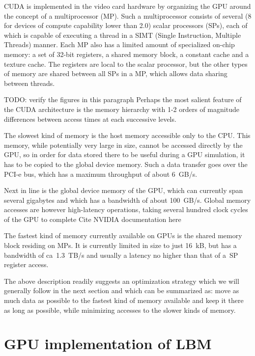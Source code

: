 \documentclass[mathpazo]{cicp}
\begin{document}
CUDA is implemented in the video card hardware by organizing the GPU around the
concept of a multiprocessor (MP).  Such a multiprocessor consists of several (8 for
devices of compute capability lower than 2.0) scalar processors (SPs), each of which is
capable of executing a thread in a SIMT (Single Instruction, Multiple Threads) manner.
Each MP also has a limited amount of specialized on-chip memory: a set of 32-bit registers,
a shared memory block, a constant cache and a texture cache.  The registers are local
to the scalar processor, but the other types of memory are shared between all SPs
in a MP, which allows data sharing between threads.

{\color{red} TODO: verify the figures in this paragraph}
Perhaps the most salient feature of the CUDA architecture is the memory hierarchy
with 1-2 orders of magnitude differences between access times at each successive levels.

The slowest kind of memory is the host memory accessible only to the CPU.  This memory,
while potentially very large in size, cannot be accessed directly by the GPU, so in order
for data stored there to be useful during a GPU simulation, it has to be copied to the
global device memory.  Such a data transfer goes over the PCI-e bus, which has a maximum
throughput of about 6~GB/s.

Next in line is the global device memory of the GPU, which can currently span several
gigabytes and which has a bandwidth of about 100~GB/s.  Global memory accesses are however
high-latency operations, taking several hundred clock cycles of the GPU to complete {\color{red} Cite NVIDIA documentation here}

The fastest kind of memory currently available on GPUs is the shared memory block residing
on MPs.  It is currently limited in size to just 16~kB, but has a bandwidth of ca~1.3~TB/s
and usually a latency no higher than that of a~SP register access.

The above description readily suggests an optimization strategy which we will generally
follow in the next section and which can be summarized as: move as much data as possible
to the fastest kind of memory available and keep it there as long as possible, while minimizing
accesses to the slower kinds of memory.

\section{GPU implementation of LBM}
\end{document}
